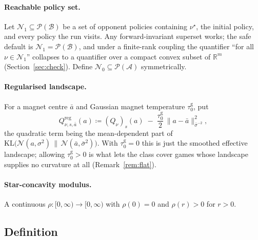 \documentclass[11pt]{article}
\theoremstyle{definition}
\newcommand{\R}{\mathbb{R}}
\newcommand{\cA}{\mathcal{A}}
\newcommand{\cB}{\mathcal{B}}
\newcommand{\cP}{\mathcal{P}}
\newcommand{\cN}{\mathcal{N}}
\newcommand{\KL}{\mathrm{KL}}
\begin{document}
\paragraph{Reachable policy set.} Let $\cN_1 \subseteq \cP(\cB)$ be a set of
opponent policies containing $\nu^\star$, the initial policy, and every policy
the run visits. Any forward-invariant superset works; the safe default is
$\cN_1 = \cP(\cB)$, and under a finite-rank coupling the quantifier
``for all $\nu \in \cN_1$'' collapses to a quantifier over a compact convex
subset of $\R^m$ (Section~\ref{sec:check}). Define $\cN_0 \subseteq \cP(\cA)$
symmetrically.

\paragraph{Regularised landscape.} For a magnet centre $\bar a$ and Gaussian
magnet temperature $\tau^{\mathrm g}_0$, put
\begin{equation}\label{eq:reg}
  Q^{\mathrm{reg}}_{\nu, s, \bar a}(a) \coloneqq (Q_\nu)_s(a)
  \;-\; \frac{\tau^{\mathrm g}_0}{2}\,\big\|a - \bar a\big\|^2_{\bar\sigma^{-2}} ,
\end{equation}
the quadratic term being the mean-dependent part of
$\KL\big(\cN(a,\sigma^2)\,\|\,\cN(\bar a,\bar\sigma^2)\big)$. With
$\tau^{\mathrm g}_0 = 0$ this is just the smoothed effective landscape;
allowing $\tau^{\mathrm g}_0 > 0$ is what lets the class cover games whose
landscape supplies no curvature at all (Remark~\ref{rem:flat}).

\paragraph{Star-concavity modulus.} A continuous $\rho : [0,\infty) \to
[0,\infty)$ with $\rho(0) = 0$ and $\rho(r) > 0$ for $r > 0$.

\subsection{Definition}
\end{document}
